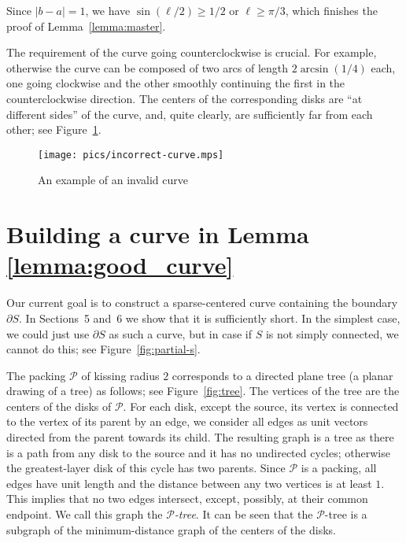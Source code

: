\medskip Since $|b - a| = 1$, we have $\sin(\ell/2)\geq 1/2$ or $\ell\geq\pi/3$, which finishes the proof of Lemma~\ref{lemma:master}.

\begin{remark}
The requirement of the curve going counterclockwise is crucial. For example, otherwise the curve can be composed of two arcs of length $2\arcsin(1/4)$ each, one going clockwise and the other smoothly continuing the first in the counterclockwise direction. The centers of the corresponding disks are ``at different sides'' of the curve, and, quite clearly, are sufficiently far from each other; see Figure~\ref{fig:incorrect-curve}.
\end{remark}

\begin{figure}[h!]
    \centering
    \texttt{[image: pics/incorrect-curve.mps]}
    \captionsetup{width=.7\textwidth}
    \caption{An example of an invalid curve}
    \label{fig:incorrect-curve}
\end{figure}

\section{Building a curve in Lemma \ref{lemma:good_curve}}

Our current goal is to construct a sparse-centered curve containing the boundary $\partial S$. In Sections~5 and~6 we show that it is sufficiently short.
In the simplest case, we could just use $\partial S$ as such a curve, but in case if $S$ is not simply connected, we cannot do this; see Figure~\ref{fig:partial-s}.

The packing $\mathcal{P}$ of kissing radius $2$ corresponds to a directed plane tree (a planar drawing of a tree) as follows; see Figure~\ref{fig:tree}. The vertices of the tree are the centers of the disks of $\mathcal{P}$. For each disk, except the source, its vertex is connected to the vertex of its parent by an edge, we consider all edges as unit vectors directed from the parent towards its child. The resulting graph is a tree as there is a path from any disk to the source and it has no undirected cycles; otherwise the greatest-layer disk of this cycle has two parents. Since $\mathcal{P}$ is a packing, all edges have unit length and the distance between any two vertices is at least $1$. This implies that no two edges intersect, except, possibly, at their common endpoint. We call this graph the \textit{$\mathcal{P}$-tree}. It can be seen that the $\mathcal{P}$-tree is a subgraph of the minimum-distance graph of the centers of the disks.

